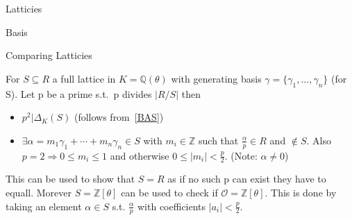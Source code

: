 \documentclass[12pt, letterpaper]{article}
\newcommand{\Q}{\mathbb{Q}}
\newcommand{\Z}{\mathbb{Z}}
\newcommand{\Ok}{\mathcal{O}}
\begin{document}
\begin{section}{Latticies}
\begin{subsection}{Basis}
  \end{subsection}

  \begin{subsection}{Comparing Latticies}

    For \(S \subseteq R\) a full lattice in \(K = \Q(\theta)\) with generating
    basis \(\gamma = \{ \gamma_{1}, \dots , \gamma_{n}\}\) (for S). Let p be a
    prime s.t.\ p divides \(| R / S |\) then
    \begin{itemize}
      \item \(p^{2} | \Delta_{K}(S)\) (follows from~\ref{BAS})
      \item \(\exists \alpha = m_{1} \gamma_{1} + \cdots + m_{n} \gamma_{n}
            \in S\) with \(m_{i} \in \Z\) such that \(\frac{\alpha}{p} \in R\)
            and \(\notin S\). Also \(p = 2 \Rightarrow 0 \leq m_{i} \leq 1\)
            and otherwise \(0 \leq | m_{i} | < \frac{p}{2}\). (Note: \(\alpha
            \neq 0\))
    \end{itemize}
    This can be used to show that \(S = R\) as if no such p can exist they have
    to equall. Morever \(S = \Z[\theta]\) can be used to check if
    \(\Ok = \Z[\theta]\). This is done by taking an element \(\alpha \in S\)
    s.t. \(\frac{\alpha}{p}\) with coefficients \(| a_{i} | < \frac{p}{2}\).

  \end{subsection}

\end{section}
\end{document}
